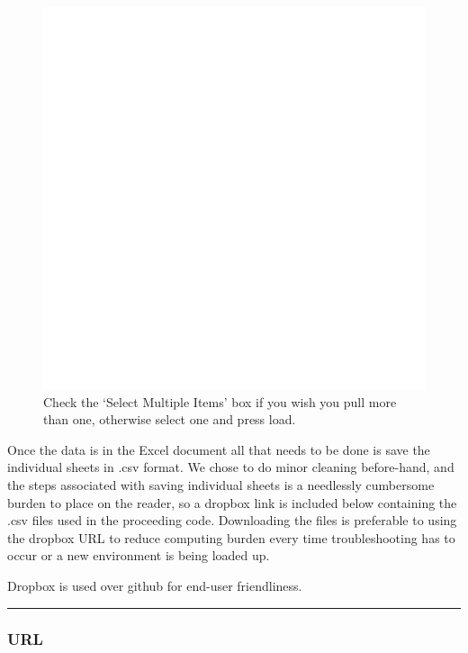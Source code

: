 \documentclass[
  11,
]{book}
\begin{document}
\begin{figure}
\centering
\includegraphics{_book/_main_files/images/Excel_Query_Multi.png}
\caption{\label{fig:image3}Check the `Select Multiple Items' box if you wish you pull more than one, otherwise select one and press load.}
\end{figure}

Once the data is in the Excel document all that needs to be done is save the individual sheets in .csv format. We chose to do minor cleaning before-hand, and the steps associated with saving individual sheets is a needlessly cumbersome burden to place on the reader, so a dropbox link is included below containing the .csv files used in the proceeding code. Downloading the files is preferable to using the dropbox URL to reduce computing burden every time troubleshooting has to occur or a new environment is being loaded up.

Dropbox is used over github for end-user friendliness.

\begin{center}\rule{0.5\linewidth}{0.5pt}\end{center}

\hypertarget{url}{%
\subsubsection*{URL}\label{url}}
\end{document}
